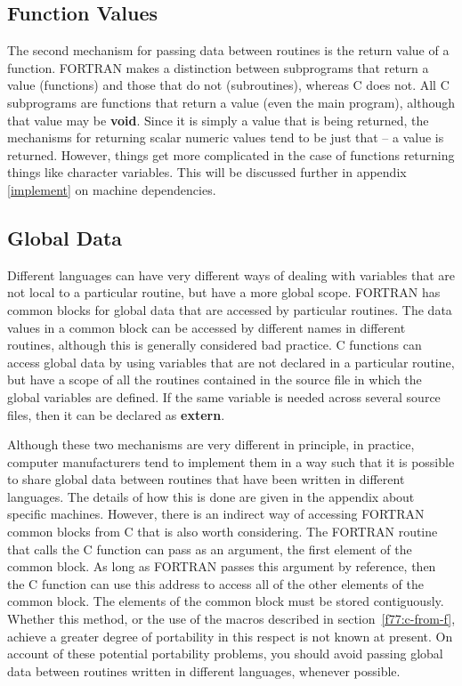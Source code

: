 \subsection{Function Values}

The second mechanism for passing data between routines is the return value of a
function. FORTRAN makes a distinction between subprograms that return a value
(functions) and those that do not (subroutines), whereas C does not. All C
subprograms are functions that return a value (even the main program), although
that value may be {\bf void}. Since it is simply a value that is being
returned, the mechanisms for returning scalar numeric values tend to be just
that -- a value is returned. However, things get more complicated in the case of
functions returning things like character variables. This will be discussed
further in appendix \ref{implement} on machine dependencies.

\subsection{Global Data}

Different languages can have very different ways of dealing with variables that
are not local to a particular routine, but have a more global scope. FORTRAN
has common blocks for global data that are accessed by particular routines. The
data values in a common block can be accessed by different names in different
routines, although this is generally considered bad practice. C functions can
access global data by using variables that are not declared in a particular
routine, but have a scope of all the routines contained in the source file in
which the global variables are defined. If the same variable is needed across
several source files, then it can be declared as {\bf extern}.

Although these two mechanisms are very different in principle, in practice,
computer manufacturers tend to implement them in a way such that it is possible
to share global data between routines that have been written in different
languages. The details of how this is done are given in the appendix about
specific machines. However, there is an indirect way of accessing FORTRAN
common blocks from C that is also worth considering. The FORTRAN routine that
calls the C function can pass as an argument, the first element of the common
block. As long as FORTRAN passes this argument by reference, then the C
function can use this address to access all of the other elements of the common
block. The elements of the common block must be stored contiguously. Whether
this method, or the use of the macros described in section~\ref{f77:c-from-f},
achieve a greater degree of portability in this respect is not known at
present. On account of these potential portability problems, you should avoid
passing global data between routines written in different languages, whenever
possible.

